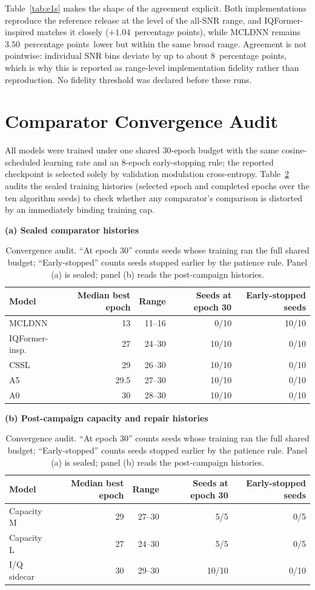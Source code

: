 \documentclass[letterpaper,onecolumn,11pt,journal]{IEEEtran}
\newcommand{\pp}{percentage points}
\begin{document}
Table~\ref{tab:e1s} makes the shape of the agreement explicit. Both
implementations reproduce the reference release at the level of the all-SNR
range, and IQFormer-inspired matches it closely ($+1.04$~\pp), while MCLDNN
remains $3.50$~\pp\ lower but within the same broad range. Agreement is not
pointwise: individual SNR bins deviate by up to about $8$~\pp, which is why
this is reported as range-level implementation fidelity rather than
reproduction. No fidelity threshold was declared before these runs.

\section{Comparator Convergence Audit}
All models were trained under one shared 30-epoch budget with the same
cosine-scheduled learning rate and an 8-epoch early-stopping rule; the
reported checkpoint is selected solely by validation modulation
cross-entropy. Table~\ref{tab:convergence} audits the sealed training
histories (selected epoch and completed epochs over the ten algorithm seeds)
to check whether any comparator's comparison is distorted by an immediately
binding training cap.

\begin{table}[t]
\centering
\caption{Convergence audit. ``At epoch 30'' counts seeds whose training ran the
full shared budget; ``Early-stopped'' counts seeds stopped earlier by the
patience rule. Panel (a) is sealed; panel (b) reads the post-campaign histories.}
\label{tab:convergence}
\footnotesize
\setlength{\tabcolsep}{5pt}
\textbf{(a) Sealed comparator histories}\\[2pt]
\begin{tabular}{lrrrr}
\toprule
Model & Median best epoch & Range & Seeds at epoch 30 & Early-stopped seeds\\
\midrule
MCLDNN & 13 & 11--16 & 0/10 & 10/10\\
IQFormer-insp. & 27 & 24--30 & 10/10 & 0/10\\
CSSL & 29 & 26--30 & 10/10 & 0/10\\
A5 & 29.5 & 27--30 & 10/10 & 0/10\\
A0 & 30 & 28--30 & 10/10 & 0/10\\
\bottomrule
\end{tabular}

\vspace{5pt}
\textbf{(b) Post-campaign capacity and repair histories}\\[2pt]
\begin{tabular}{lrrrr}
\toprule
Model & Median best epoch & Range & Seeds at epoch 30 & Early-stopped seeds\\
\midrule
Capacity M & 29 & 27--30 & 5/5 & 0/5\\
Capacity L & 27 & 24--30 & 5/5 & 0/5\\
I/Q sidecar & 30 & 29--30 & 10/10 & 0/10\\
\bottomrule
\end{tabular}
\end{table}
\end{document}
